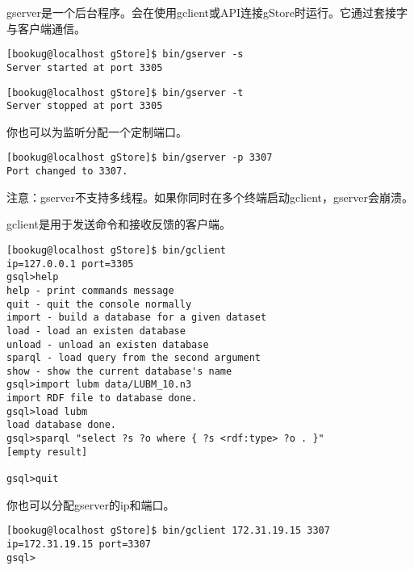 \documentclass[titlepage, a4paper, 12pt]{article}
\begin{document}

gserver是一个后台程序。会在使用gclient或API连接gStore时运行。它通过套接字与客户端通信。

\begin{verbatim}
[bookug@localhost gStore]$ bin/gserver -s
Server started at port 3305
\end{verbatim}

\begin{verbatim}
[bookug@localhost gStore]$ bin/gserver -t
Server stopped at port 3305
\end{verbatim}

你也可以为监听分配一个定制端口。

\begin{verbatim}
[bookug@localhost gStore]$ bin/gserver -p 3307
Port changed to 3307.
\end{verbatim}

注意：gserver不支持多线程。如果你同时在多个终端启动gclient，gserver会崩溃。


gclient是用于发送命令和接收反馈的客户端。

\begin{verbatim}
[bookug@localhost gStore]$ bin/gclient
ip=127.0.0.1 port=3305
gsql>help
help - print commands message
quit - quit the console normally
import - build a database for a given dataset
load - load an existen database
unload - unload an existen database
sparql - load query from the second argument
show - show the current database's name
gsql>import lubm data/LUBM_10.n3
import RDF file to database done.
gsql>load lubm
load database done.
gsql>sparql "select ?s ?o where { ?s <rdf:type> ?o . }"
[empty result]

gsql>quit
\end{verbatim}

你也可以分配gserver的ip和端口。

\begin{verbatim}
[bookug@localhost gStore]$ bin/gclient 172.31.19.15 3307
ip=172.31.19.15 port=3307
gsql>
\end{verbatim}
\end{document}

